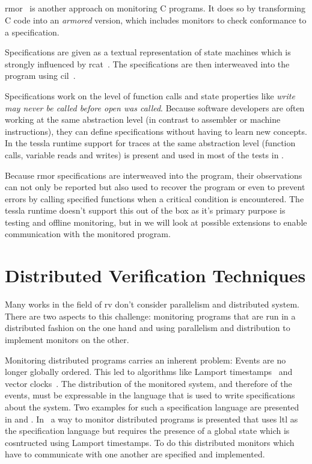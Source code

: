\subsection{}
\label{sec:related:c_programs:rmor}

\gls{rmor}~\citep{Havelund2008} is another approach on monitoring C programs.
It does so by transforming C code into an \emph{armored} version, which includes monitors to check conformance to a specification.

Specifications are given as a textual representation of state machines which is strongly influenced by \gls{rcat}~\citep{Smith2008}.
The specifications are then interweaved into the program using \gls{cil}~\cite{Necula2002}.

Specifications work on the level of function calls and state properties like \emph{write may never be called before open was called}.
Because software developers are often working at the same abstraction level (in contrast to assembler or machine instructions), they can define specifications without having to learn new concepts.
In the \gls{tessla} runtime support for traces at the same abstraction level (function calls, variable reads and writes) is present and used in most of the tests in .

Because \gls{rmor} specifications are interweaved into the program, their observations can not only be reported but also used to recover the program or even to prevent errors by calling specified functions when a critical condition is encountered.
The \gls{tessla} runtime doesn't support this out of the box as it's primary purpose is testing and offline monitoring, but in  we will look at possible extensions to enable communication with the monitored program.

\section{Distributed Verification Techniques}
\label{sec:related:distributed}

Many works in the field of \gls{rv} don't consider parallelism and distributed system.
There are two aspects to this challenge: monitoring programs that are run in a distributed fashion on the one hand and using parallelism and distribution to implement monitors on the other.

Monitoring distributed programs carries an inherent problem: Events are no longer globally ordered.
This led to algorithms like Lamport timestamps~\citep{Lamport1978} and vector clocks~\citep{Fidge1988}.
The distribution of the monitored system, and therefore of the events, must be expressable in the language that is used to write specifications about the system.
Two examples for such a specification language are presented in \cite{Sen2004} and \cite{Ehrich2000}.
In~\cite{Mostafa2015} a way to monitor distributed programs is presented that uses \gls{ltl} as the specification language but requires the presence of a global state which is cosntructed using Lamport timestamps.
To do this distributed monitors which have to communicate with one another are specified and implemented.

